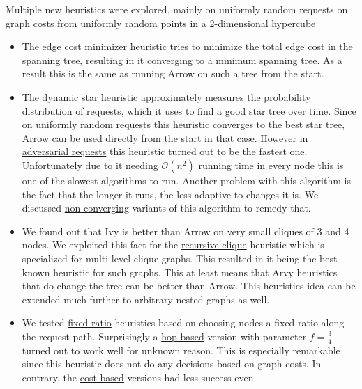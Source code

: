 \documentclass[a4paper, oneside]{discothesis}
\begin{document}
Multiple new heuristics were explored, mainly on uniformly random requests on graph costs from uniformly random points in a 2-dimensional hypercube
\begin{itemize}
\item The \hyperref[alg:ecm]{edge cost minimizer} heuristic tries to minimize the total edge cost in the spanning tree, resulting in it converging to a minimum spanning tree. As a result this is the same as running Arrow on such a tree from the start.
\item The \hyperref[alg:dynstar]{dynamic star} heuristic approximately measures the probability distribution of requests, which it uses to find a good star tree over time. Since on uniformly random requests this heuristic converges to the best star tree, Arrow can be used directly from the start in that case. However in \hyperref[req:adversary]{adversarial requests} this heuristic turned out to be the fastest one. Unfortunately due to it needing $\mathcal{O}(n^2)$ running time in every node this is one of the slowest algorithms to run. Another problem with this algorithm is the fact that the longer it runs, the less adaptive to changes it is. We discussed \hyperref[alg:ncdynstar]{non-converging} variants of this algorithm to remedy that.
\item We found out that Ivy is better than Arrow on very small cliques of 3 and 4 nodes. We exploited this fact for the \hyperref[alg:reclique]{recursive clique} heuristic which is specialized for multi-level clique graphs. This resulted in it being the best known heuristic for such graphs. This at least means that Arvy heuristics that do change the tree can be better than Arrow. This heuristics idea can be extended much further to arbitrary nested graphs as well.
\item We tested \hyperref[alg:fr]{fixed ratio} heuristics based on choosing nodes a fixed ratio along the request path. Surprisingly a \hyperref[alg:frh]{hop-based} version with parameter $f=\frac{3}{4}$ turned out to work well for unknown reason. This is especially remarkable since this heuristic does not do any decisions based on graph costs. In contrary, the \hyperref[alg:frc]{cost-based} versions had less success even.
\end{itemize}



\end{document}
